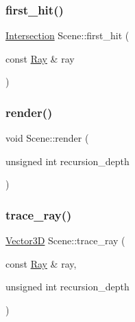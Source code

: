 \mbox{\label{classScene_a726867ff812fd8776fe0b4319538e9e7}} 
\subsubsection{\texorpdfstring{first\_hit()}{first\_hit()}\hspace{0.1cm}{\footnotesize\ttfamily [2/2]}}
{\footnotesize\ttfamily \mbox{\hyperlink{classIntersection}{Intersection}} Scene\+::first\+\_\+hit (\begin{DoxyParamCaption}\item[{const \mbox{\hyperlink{classRay}{Ray}} \&}]{ray }\end{DoxyParamCaption})\hspace{0.3cm}{\ttfamily [private]}}

\mbox{\label{classScene_a19a594ba70c411fb6fddb1e9d772da52}} 
\subsubsection{\texorpdfstring{render()}{render()}}
{\footnotesize\ttfamily void Scene\+::render (\begin{DoxyParamCaption}\item[{unsigned int}]{recursion\+\_\+depth }\end{DoxyParamCaption})}

\mbox{\label{classScene_a9ccd15bf4c359c1585fe87d85d424d55}} 
\subsubsection{\texorpdfstring{trace\_ray()}{trace\_ray()}}
{\footnotesize\ttfamily \mbox{\hyperlink{classVector3D}{Vector3D}} Scene\+::trace\+\_\+ray (\begin{DoxyParamCaption}\item[{const \mbox{\hyperlink{classRay}{Ray}} \&}]{ray,  }\item[{unsigned int}]{recursion\+\_\+depth }\end{DoxyParamCaption})\hspace{0.3cm}{\ttfamily [private]}}



